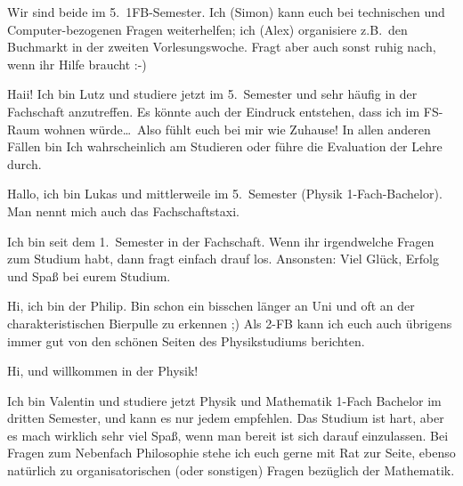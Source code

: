 \begin{multicols*}{2}
{Wir sind beide im 5.\ 1FB-Semester. Ich (Simon) kann euch bei technischen und Computer-bezogenen Fragen weiterhelfen; ich (Alex) organisiere z.B.\ den Buchmarkt in der zweiten Vorlesungswoche. Fragt aber auch sonst ruhig nach, wenn ihr Hilfe braucht :-)}

{Haii! Ich bin Lutz und studiere jetzt im 5.\ Semester und sehr häufig in der Fachschaft anzutreffen. Es könnte auch der Eindruck entstehen, dass ich im FS-Raum wohnen würde\dots\ Also fühlt euch bei mir wie Zuhause! In allen anderen Fällen bin Ich wahrscheinlich am Studieren oder führe die Evaluation der Lehre durch.}

{Hallo, ich bin Lukas und mittlerweile im 5.\ Semester (Physik 1-Fach-Bachelor). Man nennt mich auch das Fachschaftstaxi.

Ich bin seit dem 1.\ Semester in der Fachschaft. Wenn ihr irgendwelche Fragen zum Studium habt, dann fragt einfach drauf los. Ansonsten: Viel Glück, Erfolg und Spaß bei eurem Studium.}

{Hi, ich bin der Philip. Bin schon ein bisschen länger an Uni und oft an der charakteristischen Bierpulle zu erkennen ;) Als 2-FB kann ich euch auch übrigens immer gut von den schönen Seiten des Physikstudiums berichten.}

{Hi, und willkommen in der Physik!

Ich bin Valentin und studiere jetzt Physik und Mathematik 1-Fach Bachelor im dritten Semester, und kann es nur jedem empfehlen. Das Studium ist hart, aber es mach wirklich sehr viel Spaß, wenn man bereit ist sich darauf einzulassen. Bei Fragen zum Nebenfach Philosophie stehe ich euch gerne mit Rat zur Seite, ebenso natürlich zu organisatorischen (oder sonstigen) Fragen bezüglich der Mathematik.

}
\end{multicols*}
